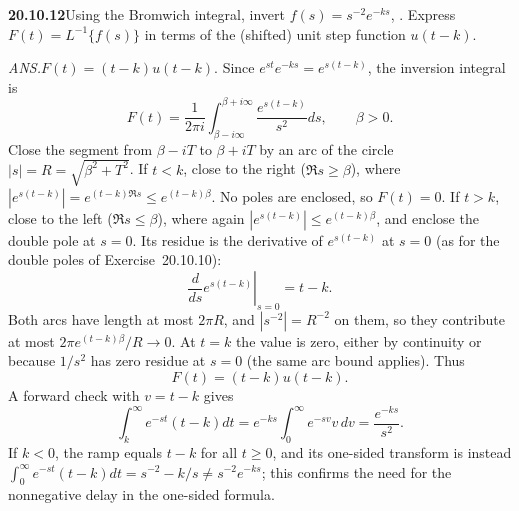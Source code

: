 \par\bigskip
\noindent\textbf{20.10.12}\quad Using the Bromwich integral,
invert $f(s)=s^{-2}e^{-ks}$, . Express $F(t)=L^{-1}\{f(s)\}$ in
terms of the (shifted) unit step function $u(t-k)$.
\par\nobreak\hfill\emph{ANS.}\enspace$F(t)=(t-k)u(t-k)$.
\solution
{}
Since $e^{st}e^{-ks}=e^{s(t-k)}$, the inversion integral is
\[
F(t)=\frac1{2\pi i}\int_{\beta-i\infty}^{\beta+i\infty}
\frac{e^{s(t-k)}}{s^2}ds,\qquad\beta>0.
\]
Close the segment from $\beta-iT$ to $\beta+iT$ by an arc of
the circle $|s|=R=\sqrt{\beta^2+T^2}$. If $t<k$, close to the
right ($\Re s\ge\beta$), where
$|e^{s(t-k)}|=e^{(t-k)\Re s}\le e^{(t-k)\beta}$. No poles are
enclosed, so $F(t)=0$. If $t>k$, close to the left
($\Re s\le\beta$), where again $|e^{s(t-k)}|\le e^{(t-k)\beta}$,
and enclose the double pole at $s=0$. Its residue is the
derivative of $e^{s(t-k)}$ at $s=0$ (as for the double poles
of Exercise~20.10.10):
\[
\left.\frac d{ds}e^{s(t-k)}\right|_{s=0}=t-k.
\]
Both arcs have length at most $2\pi R$, and $|s^{-2}|=R^{-2}$
on them, so they contribute at most
$2\pi e^{(t-k)\beta}/R\to0$. At $t=k$ the value is zero,
either by continuity or because $1/s^2$ has zero residue at
$s=0$ (the same arc bound applies).
Thus
\[
\boxed{F(t)=(t-k)u(t-k)}.
\]
A forward check with $v=t-k$ gives
\[
\int_k^\infty e^{-st}(t-k)dt
=e^{-ks}\int_0^\infty e^{-sv}v\,dv=\frac{e^{-ks}}{s^2}.
\]
If $k<0$, the ramp equals $t-k$ for all $t\ge0$, and its
one-sided transform is instead
$\int_0^\infty e^{-st}(t-k)dt=s^{-2}-k/s\ne s^{-2}e^{-ks}$; this
confirms the need for the nonnegative delay in the one-sided
formula.

